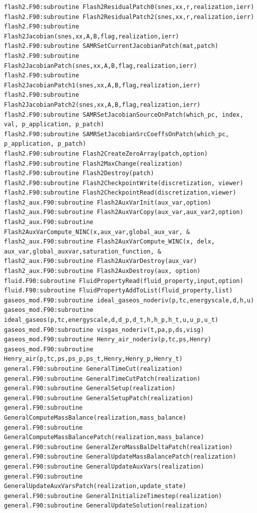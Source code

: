 \documentclass[12pt]{article}
\begin{document}
\begin{verbatim}
flash2.F90:subroutine Flash2ResidualPatch0(snes,xx,r,realization,ierr)
flash2.F90:subroutine Flash2ResidualPatch2(snes,xx,r,realization,ierr)
flash2.F90:subroutine Flash2Jacobian(snes,xx,A,B,flag,realization,ierr)
flash2.F90:subroutine SAMRSetCurrentJacobianPatch(mat,patch) 
flash2.F90:subroutine Flash2JacobianPatch(snes,xx,A,B,flag,realization,ierr)
flash2.F90:subroutine Flash2JacobianPatch1(snes,xx,A,B,flag,realization,ierr)
flash2.F90:subroutine Flash2JacobianPatch2(snes,xx,A,B,flag,realization,ierr)
flash2.F90:subroutine SAMRSetJacobianSourceOnPatch(which_pc, index, val, p_application, p_patch) 
flash2.F90:subroutine SAMRSetJacobianSrcCoeffsOnPatch(which_pc, p_application, p_patch) 
flash2.F90:subroutine Flash2CreateZeroArray(patch,option)
flash2.F90:subroutine Flash2MaxChange(realization)
flash2.F90:subroutine Flash2Destroy(patch)
flash2.F90:subroutine Flash2CheckpointWrite(discretization, viewer)
flash2.F90:subroutine Flash2CheckpointRead(discretization,viewer)
flash2_aux.F90:subroutine Flash2AuxVarInit(aux_var,option)
flash2_aux.F90:subroutine Flash2AuxVarCopy(aux_var,aux_var2,option)
flash2_aux.F90:subroutine Flash2AuxVarCompute_NINC(x,aux_var,global_aux_var, &
flash2_aux.F90:subroutine Flash2AuxVarCompute_WINC(x, delx, aux_var,global_auxvar,saturation_function, &
flash2_aux.F90:subroutine Flash2AuxVarDestroy(aux_var)
flash2_aux.F90:subroutine Flash2AuxDestroy(aux, option)
fluid.F90:subroutine FluidPropertyRead(fluid_property,input,option)
fluid.F90:subroutine FluidPropertyAddToList(fluid_property,list)
gaseos_mod.F90:subroutine ideal_gaseos_noderiv(p,tc,energyscale,d,h,u)
gaseos_mod.F90:subroutine ideal_gaseos(p,tc,energyscale,d,d_p,d_t,h,h_p,h_t,u,u_p,u_t)
gaseos_mod.F90:subroutine visgas_noderiv(t,pa,p,ds,visg)
gaseos_mod.F90:subroutine Henry_air_noderiv(p,tc,ps,Henry)
gaseos_mod.F90:subroutine Henry_air(p,tc,ps,ps_p,ps_t,Henry,Henry_p,Henry_t)
general.F90:subroutine GeneralTimeCut(realization)
general.F90:subroutine GeneralTimeCutPatch(realization)
general.F90:subroutine GeneralSetup(realization)
general.F90:subroutine GeneralSetupPatch(realization)
general.F90:subroutine GeneralComputeMassBalance(realization,mass_balance)
general.F90:subroutine GeneralComputeMassBalancePatch(realization,mass_balance)
general.F90:subroutine GeneralZeroMassBalDeltaPatch(realization)
general.F90:subroutine GeneralUpdateMassBalancePatch(realization)
general.F90:subroutine GeneralUpdateAuxVars(realization)
general.F90:subroutine GeneralUpdateAuxVarsPatch(realization,update_state)
general.F90:subroutine GeneralInitializeTimestep(realization)
general.F90:subroutine GeneralUpdateSolution(realization)

\end{verbatim}
\end{document}
